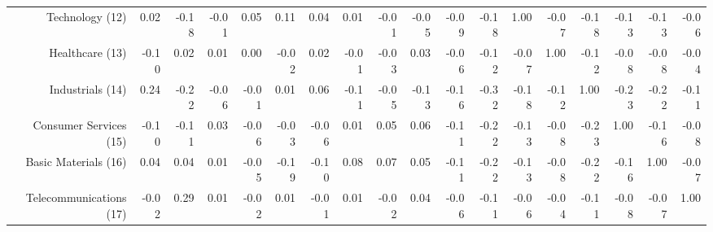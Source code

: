 \begin{sidewaystable}
{\begin{tabular}{rrrrrrrrrrrrrrrrrr}
Technology (12)         & 0.02  & -0.18 & -0.01 & 0.05  & 0.11  & 0.04  & 0.01  & -0.01 & -0.05 & -0.09 & -0.18 & 1.00  & -0.07 & -0.18 & -0.13 & -0.13 & -0.06 \\
Healthcare (13)         & -0.10 & 0.02  & 0.01  & 0.00  & -0.02 & 0.02  & -0.01 & -0.03 & 0.03  & -0.06 & -0.12 & -0.07 & 1.00  & -0.12 & -0.08 & -0.08 & -0.04 \\
Industrials (14)        & 0.24  & -0.22 & -0.06 & -0.01 & 0.01  & 0.06  & -0.11 & -0.05 & -0.13 & -0.16 & -0.32 & -0.18 & -0.12 & 1.00  & -0.23 & -0.22 & -0.11 \\
Consumer Services (15)  & -0.10 & -0.11 & 0.03  & -0.06 & -0.03 & -0.06 & 0.01  & 0.05  & 0.06  & -0.11 & -0.22 & -0.13 & -0.08 & -0.23 & 1.00  & -0.16 & -0.08 \\
Basic Materials (16)    & 0.04  & 0.04  & 0.01  & -0.05 & -0.19 & -0.10 & 0.08  & 0.07  & 0.05  & -0.11 & -0.22 & -0.13 & -0.08 & -0.22 & -0.16 & 1.00  & -0.07 \\
Telecommunications (17) & -0.02 & 0.29  & 0.01  & -0.02 & 0.01  & -0.01 & 0.01  & -0.02 & 0.04  & -0.06 & -0.11 & -0.06 & -0.04 & -0.11 & -0.08 & -0.07 & 1.00
           \\ 
   \bottomrule
\end{tabular}}
\end{sidewaystable}
